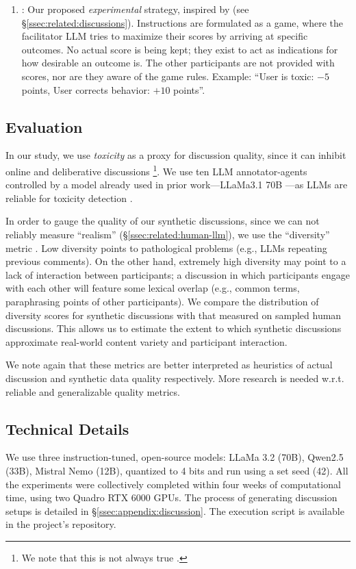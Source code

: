 \begin{enumerate}
    \item \textbf{\strategymodgame}: Our proposed \emph{experimental} strategy, inspired by \citet{abdelnabi_negotiations} (see \S\ref{ssec:related:discussions}). Instructions are formulated as a game, where the facilitator LLM tries to maximize their scores by arriving at specific outcomes. No actual score is being kept; they exist to act as indications for how desirable an outcome is. The other participants are not provided with scores, nor are they aware of the game rules. Example: ``User is toxic: $-5$ points, User corrects behavior: $+10$ points''.
\end{enumerate}



\subsection{Evaluation}
\label{ssec:experimental:evaluation}

In our study, we use \emph{toxicity} as a proxy for discussion quality, since it can inhibit online and deliberative discussions \citep{dekock2022disagree, XiaToxicity}\footnote{We note that this is not always true \citep{Avalle2024PersistentIP}.}. We use ten LLM annotator-agents controlled by a model already used in prior work---LLaMa3.1 70B \citep{kang-qian-2024-implanting}---as LLMs are reliable for toxicity detection \citep{kang-qian-2024-implanting, Wang2022ToxicityDW, anjum2024hate}.

In order to gauge the quality of our synthetic discussions, since we can not reliably measure ``realism'' (\S\ref{ssec:related:human-llm}), we use the ``diversity'' metric \citep{ulmer2024}. Low diversity points to pathological problems (e.g., LLMs repeating previous comments). On the other hand, extremely high diversity may point to a lack of interaction between participants; a discussion in which participants engage with each other will feature some lexical overlap (e.g., common terms, paraphrasing points of other participants). We compare the distribution of diversity scores for synthetic discussions with that measured on sampled human discussions. This allows us to estimate the extent to which synthetic discussions approximate real-world content variety and participant interaction. 

We note again that these metrics are better interpreted as heuristics of actual discussion and synthetic data quality respectively. More research is needed w.r.t. reliable and generalizable quality metrics.


\subsection{Technical Details}
\label{ssec:experimental:setup}

We use three instruction-tuned, open-source models: LLaMa 3.2 (70B), Qwen2.5 (33B),  Mistral Nemo (12B), quantized to 4 bits and run using a set seed (42). All the experiments were collectively completed within four weeks of computational time, using two Quadro RTX 6000 GPUs. The process of generating discussion setups is detailed in \S\ref{ssec:appendix:discussion}. The execution script is available in the project's repository.\analysislink 